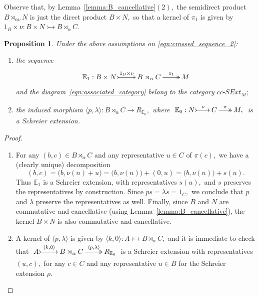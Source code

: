 \documentclass[a4paper]{amsart}
\theoremstyle{plain}
\newtheorem{proposition}[subsection]{Proposition}
\theoremstyle{definition}
\theoremstyle{remark}
\newcommand{\la}{\langle}
\newcommand{\ra}{\rangle}
\begin{document}
Observe that, by Lemma~\ref{lemma:B_cancellative}$(2),$ the semidirect product $B\rtimes_{\alpha\nu}N$ is just the direct product $B\times N,$ so that a kernel of $\pi_1$ is given by $1_B\times\nu\colon B\times N\rightarrowtail B\rtimes_{\alpha}C.$
\begin{proposition}
\label{prop:semidirect_is_Schreier}
Under the above assumptions on \eqref{eqn:crossed_sequence_2}:
\begin{enumerate}
\item the sequence
\begin{equation*}
\xymatrix{{{\mathbb{E}}_1:B\times N} \ar@{>->}[r]^-{1_B\times\nu} &{ B\rtimes_{\alpha}C} \ar@{->>}[r]^-{\pi_1} &M}
\end{equation*}
and the diagram~\eqref{eqn:associated_category} belong to the category $cc\text{-}SExt_M;$
\item the induced morphism $\la p,\lambda\ra\colon B\rtimes_{\alpha}C\rightarrow R_{{\mathbb{E}}_0},$ where $\xymatrixcolsep{1.5pc}\xymatrix{{{\mathbb{E}}_0:N} \ar@{>->}[r]^-{\nu} &{C} \ar@{->>}[r]^-{\pi} &{M,}}$ is a Schreier extension.
\end{enumerate}
\end{proposition}
\begin{proof}
\begin{enumerate}
\item For any $(b,c)\in B\rtimes_{\alpha}C$ and any representative $u\in C$ of $\pi(c),$  we have a (clearly unique) decomposition
\begin{equation*}
(b,c)=\big(b,\nu(n)+u\big)=\big(b,\nu(n)\big)+(0,u)=\big(b,\nu(n)\big)+s(u).
\end{equation*}
Thus ${\mathbb{E}}_1$ is a Schreier extension, with representatives $s(u),$ and $s$ preserves the representatives by construction. Since $ps=\lambda s=1_C,$ we conclude that $p$ and $\lambda$ preserve the representatives as well. Finally, since $B$ and $N$ are commutative and cancellative (using Lemma~\ref{lemma:B_cancellative}), the kernel $B\times N$ is also commutative and cancellative.
\item A kernel of $\la p,\lambda\ra$ is given by $\la k,0\ra\colon A\rightarrowtail B\rtimes_{\alpha}C,$ and it is immediate to check that $\xymatrix{{A} \ar@{>->}[r]^-{\la k,0\ra} &{ B\rtimes_{\alpha}C} \ar@{->>}[r]^-{\la p,\lambda\ra} &{R_{{\mathbb{E}}_0}}}$ is a Schreier extension with representatives $(u,c),$ for any $c\in C$ and any representative $u\in B$ for the Schreier extension $\rho.$
\end{enumerate}
\end{proof}
\end{document}

